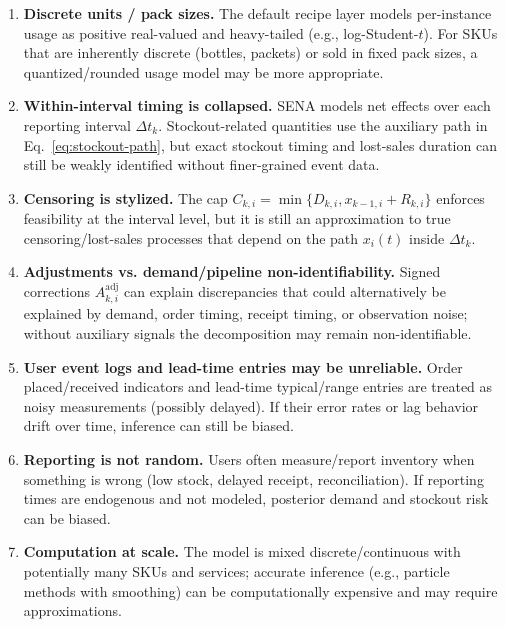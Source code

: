 \documentclass[11pt]{article}
\begin{document}
\begin{enumerate}
  \item \textbf{Discrete units / pack sizes.} The default recipe layer models per-instance usage as positive real-valued and heavy-tailed (e.g., log-Student-$t$). For SKUs that are inherently discrete (bottles, packets) or sold in fixed pack sizes, a quantized/rounded usage model may be more appropriate.

  \item \textbf{Within-interval timing is collapsed.} SENA models net effects over each reporting interval $\Delta t_k$. Stockout-related quantities use the auxiliary path in Eq.~\eqref{eq:stockout-path}, but exact stockout timing and lost-sales duration can still be weakly identified without finer-grained event data.

  \item \textbf{Censoring is stylized.} The cap $C_{k,i}=\min\{D_{k,i},x_{k-1,i}+R_{k,i}\}$ enforces feasibility at the interval level, but it is still an approximation to true censoring/lost-sales processes that depend on the path $x_i(t)$ inside $\Delta t_k$.

  \item \textbf{Adjustments vs. demand/pipeline non-identifiability.} Signed corrections $A^{\mathrm{adj}}_{k,i}$ can explain discrepancies that could alternatively be explained by demand, order timing, receipt timing, or observation noise; without auxiliary signals the decomposition may remain non-identifiable.

  \item \textbf{User event logs and lead-time entries may be unreliable.} Order placed/received indicators and lead-time typical/range entries are treated as noisy measurements (possibly delayed). If their error rates or lag behavior drift over time, inference can still be biased.

  \item \textbf{Reporting is not random.} Users often measure/report inventory when something is wrong (low stock, delayed receipt, reconciliation). If reporting times are endogenous and not modeled, posterior demand and stockout risk can be biased.

  \item \textbf{Computation at scale.} The model is mixed discrete/continuous with potentially many SKUs and services; accurate inference (e.g., particle methods with smoothing) can be computationally expensive and may require approximations.
\end{enumerate}
\end{document}
